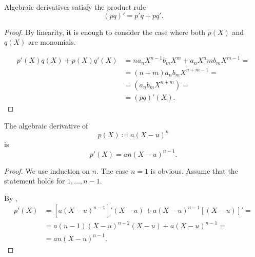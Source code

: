 \begin{proposition}\label{thm:algebraic_derivative_product_rule}
  Algebraic derivatives satisfy the product rule
  \begin{equation*}
    (pq)' = p'q + pq'.
  \end{equation*}
\end{proposition}
\begin{proof}
  By linearity, it is enough to consider the case where both \( p(X) \) and \( q(X) \) are monomials.

  \begin{align*}
    p'(X) q(X) + p(X) q'(X)
    &=
    n a_n X^{n-1} b_m X^m + a_n X^n m b_m X^{m-1}
    = \\ &=
    (n + m) a_n b_m X^{n+m-1}
    = \\ &=
    (a_n b_m X^{n+m})
    = \\ &=
    (pq)'(X).
  \end{align*}
\end{proof}

\begin{proposition}\label{thm:algebraic_derivative_of_linear_polynomial_power}
  The algebraic derivative of
  \begin{equation*}
    p(X) \coloneqq a (X - u)^n
  \end{equation*}
  is
  \begin{equation*}
    p'(X) = an(X - u)^{n-1}.
  \end{equation*}
\end{proposition}
\begin{proof}
  We use induction on \( n \). The case \( n = 1 \) is obvious. Assume that the statement holds for \( 1, \ldots, n - 1 \).

  By ,
  \begin{align*}
    p'(X)
    &=
    [a(X - u)^{n-1}]' (X - u) + a(X - u)^{n-1} [(X - u)]'
    = \\ &=
    a(n-1)(X - u)^{n-2} (X - u) + a(X - u)^{n-1}
    = \\ &=
    an(X - u)^{n-1}.
  \end{align*}
\end{proof}

